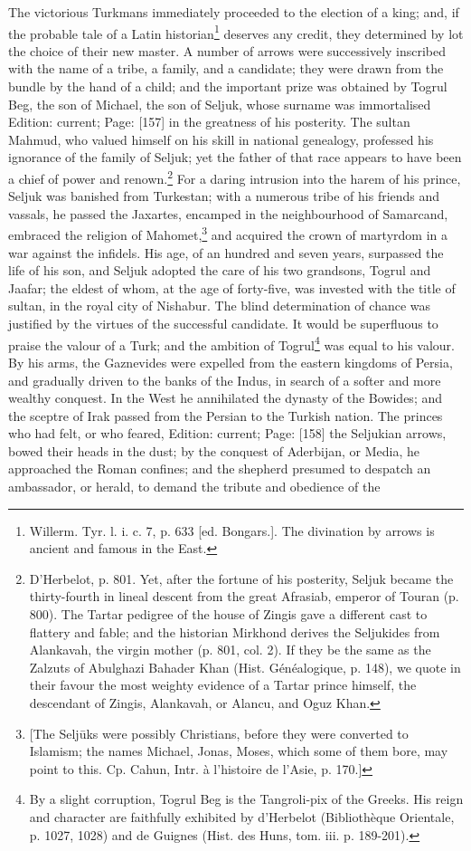 The victorious Turkmans immediately proceeded to the election of a king; and, if the probable tale of a Latin historian\footnote{Willerm. Tyr. l. i. c. 7, p. 633 [ed. Bongars.]. The divination by arrows is ancient and famous in the East.} deserves any credit, they determined by lot the choice of their new master. A number of arrows were successively inscribed with the name of a tribe, a family, and a candidate; they were drawn from the bundle by the hand of a child; and the important prize was obtained by Togrul Beg, the son of Michael, the son of Seljuk, whose surname was immortalised Edition: current; Page: [157] in the greatness of his posterity. The sultan Mahmud, who valued himself on his skill in national genealogy, professed his ignorance of the family of Seljuk; yet the father of that race appears to have been a chief of power and renown.\footnote{D\texthebrew{}’Herbelot, p. 801. Yet, after the fortune of his posterity, Seljuk became the thirty-fourth in lineal descent from the great Afrasiab, emperor of Touran (p. 800). The Tartar pedigree of the house of Zingis gave a different cast to flattery and fable; and the historian Mirkhond derives the Seljukides from Alankavah, the virgin mother (p. 801, col. 2). If they be the same as the Zalzuts of Abulghazi Bahader Khan (Hist. Généalogique, p. 148), we quote in their favour the most weighty evidence of a Tartar prince himself, the descendant of Zingis, Alankavah, or Alancu, and Oguz Khan.} For a daring intrusion into the harem of his prince, Seljuk was banished from Turkestan; with a numerous tribe of his friends and vassals, he passed the Jaxartes, encamped in the neighbourhood of Samarcand, embraced the religion of Mahomet,\footnote{[The Seljūks were possibly Christians, before they were converted to Islamism; the names Michael, Jonas, Moses, which some of them bore, may point to this. Cp. Cahun, Intr. à l\texthebrew{}’histoire de l\texthebrew{}’Asie, p. 170.]} and acquired the crown of martyrdom in a war against the infidels. His age, of an hundred and seven years, surpassed the life of his son, and Seljuk adopted the care of his two grandsons, Togrul and Jaafar; the eldest of whom, at the age of forty-five, was invested with the title of sultan, in the royal city of Nishabur. The blind determination of chance was justified by the virtues of the successful candidate. It would be superfluous to praise the valour of a Turk; and the ambition of Togrul\footnote{By a slight corruption, Togrul Beg is the Tangroli-pix of the Greeks. His reign and character are faithfully exhibited by d\texthebrew{}’Herbelot (Bibliothèque Orientale, p. 1027, 1028) and de Guignes (Hist. des Huns, tom. iii. p. 189-201).} was equal to his valour. By his arms, the Gaznevides were expelled from the eastern kingdoms of Persia, and gradually driven to the banks of the Indus, in search of a softer and more wealthy conquest. In the West he annihilated the dynasty of the Bowides; and the sceptre of Irak passed from the Persian to the Turkish nation. The princes who had felt, or who feared, Edition: current; Page: [158] the Seljukian arrows, bowed their heads in the dust; by the conquest of Aderbijan, or Media, he approached the Roman confines; and the shepherd presumed to despatch an ambassador, or herald, to demand the tribute and obedience of the 